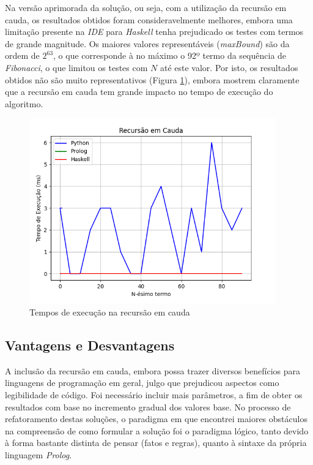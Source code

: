\documentclass[a4paper, 12pt]{article}
\begin{document}
Na versão aprimorada da solução, ou seja, com a utilização da recursão em cauda, os resultados obtidos foram consideravelmente melhores, embora uma limitação presente na \emph{IDE} para \emph{Haskell} tenha prejudicado os testes com termos de grande magnitude. Os maiores valores representáveis (\emph{maxBound}) são da ordem de \(2^{63}\), o que corresponde à no máximo o 92º termo da sequência de \emph{Fibonacci}, o que limitou os testes com \(N\) até este valor. Por isto, os resultados obtidos não são muito representativos (Figura \ref{fig:exampleFig5}), embora mostrem claramente que a recursão em cauda tem grande impacto no tempo de execução do algoritmo.

\begin{figure}[H]
    \centering
    \includegraphics[width=0.95\textwidth]{Images/tail.png}
    \caption{Tempos de execução na recursão em cauda}
    \label{fig:exampleFig5}
\end{figure}

\subsection{Vantagens e Desvantagens}

A inclusão da recursão em cauda, embora possa trazer diversos benefícios para linguagens de programação em geral, julgo que prejudicou aspectos como legibilidade de código. Foi necessário incluir mais parâmetros, a fim de obter os resultados com base no incremento gradual dos valores base. No processo de refatoramento destas soluções, o paradigma em que encontrei maiores obstáculos na compreensão de como formular a solução foi o paradigma lógico, tanto devido à forma bastante distinta de pensar (fatos e regras), quanto à sintaxe da própria linguagem \emph{Prolog}.
\end{document}
